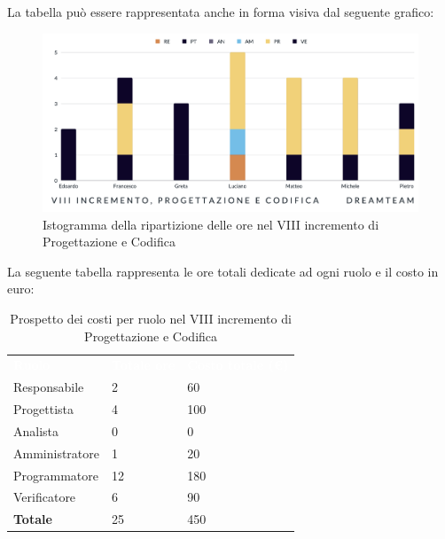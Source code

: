 La tabella può essere rappresentata anche in forma visiva dal seguente grafico:
\begin{figure}[H]
\centering
\includegraphics[scale=0.50]{Sezioni/SezioniPreventivo/grafici/progettazione/Progettazione_VIII_incremento.png}
\caption{Istogramma della ripartizione delle ore nel VIII incremento di Progettazione e Codifica}
\end{figure}

La seguente tabella rappresenta le ore totali dedicate ad ogni ruolo e il costo in euro:

\begin{table}[H]
\begin{center}
\renewcommand{\arraystretch}{1.5}
\begin{tabular}{ m{}<{\centering}  m{}<{\centering} m{}<{\centering}}
	\rowcolor{darkblue}
	\textcolor{white}{\textbf{Ruolo}}&\textcolor{white}{\textbf{Totale ore}}&\textcolor{white}{\textbf{Costo totale (\euro)}}\\ 

	Responsabile  & 2 & 60 \\	
	
	Progettista & 4 & 100 \\
	
	Analista & 0 & 0 \\

	Amministratore & 1 & 20 \\
	
	Programmatore & 12 & 180 \\
	
	Verificatore & 6 & 90 \\
	
	\textbf{Totale} & 25 & 450 \\
	
\end{tabular}
\caption{Prospetto dei costi per ruolo nel VIII incremento di Progettazione e Codifica}
\end{center}
\end{table}

